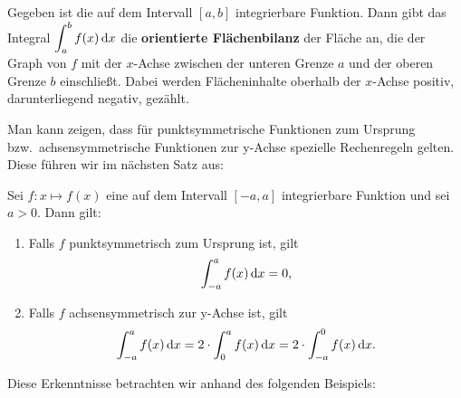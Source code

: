 \documentclass[ngerman, 12pt]{nssheetxea}
\begin{document}
\begin{theorem}
Gegeben ist die auf dem Intervall $[a,b]$ integrierbare Funktion. Dann gibt das Integral $\displaystyle \int_a^b f(x) \mathop{}\!\mathrm{d} x$ die \textbf{orientierte Flächenbilanz} der Fläche an, die der Graph von $f$ mit der $x$-Achse zwischen der unteren Grenze $a$ und der oberen Grenze $b$ einschließt. Dabei werden Flächeninhalte oberhalb der $x$-Achse positiv, darunterliegend negativ, gezählt.
\end{theorem}
Man kann zeigen, dass für punktsymmetrische Funktionen zum Ursprung bzw.\ achsensymmetrische Funktionen zur y-Achse spezielle Rechenregeln gelten. Diese führen wir im nächsten Satz aus:

\begin{theorem}
Sei $f:x\mapsto f(x)$ eine auf dem Intervall $[-a,a]$ integrierbare Funktion und sei $a>0$. Dann gilt:
\begin{enumerate}
\item Falls $f$ punktsymmetrisch zum Ursprung ist, gilt \[ \displaystyle \int_{-a}^a f(x) \mathop{}\!\mathrm{d} x = 0,\]
\item Falls $f$ achsensymmetrisch zur y-Achse ist, gilt \[ \displaystyle \int_{-a}^a f(x) \mathop{}\!\mathrm{d} x = 2\cdot \int_{0}^a f(x) \mathop{}\!\mathrm{d} x = 2\cdot \int_{-a}^0 f(x) \mathop{}\!\mathrm{d} x.\]
\end{enumerate}
\label{Satz:Symmetrie_Integral}
\end{theorem}

Diese Erkenntnisse betrachten wir anhand des folgenden Beispiels:
\end{document}
